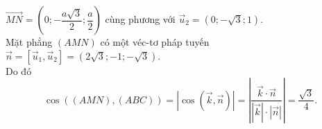 \begin{ex}
{		 $\overrightarrow{MN} = \left(0; -\dfrac{a\sqrt{3}}{2}; \dfrac{a}{2}\right)$ cùng phương với $\overrightarrow{u}_2 = (0; -\sqrt{3}; 1)$.\\
		Mặt  phẳng $(AMN)$ có một véc-tơ pháp tuyến $\overrightarrow{n} = \left[\overrightarrow{u}_1, \overrightarrow{u}_2\right] = \left(2\sqrt{3}; -1; -\sqrt{3}\right)$.\\
		Do đó 
		$$ 
		\cos\left((AMN),(ABC)\right) = \left|\cos\left(\overrightarrow{k},\overrightarrow{n}\right)\right| = \left|\dfrac{\overrightarrow{k} \cdot \overrightarrow{n}}{\left|\overrightarrow{k}\right|\cdot  \left|\overrightarrow{n}\right|}\right| = \dfrac{\sqrt{3}}{4}.
		 $$
	 }
\end{ex}

